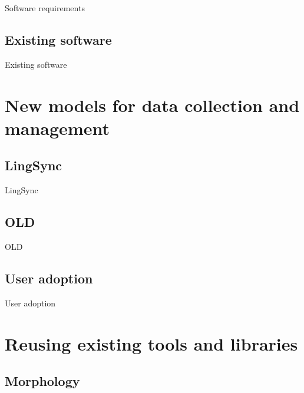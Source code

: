\documentclass{beamer}
\begin{document}
\begin{frame}
Software requirements
\end{frame}


\subsection{Existing software}

\begin{frame}
Existing software
\end{frame}


\section[LingSync/OLD]{New models for data collection and management}
\subsection{LingSync}\label{sec:lingsync}

\begin{frame}
LingSync
\end{frame}

\subsection{OLD}\label{sec:old}

\begin{frame}
OLD
\end{frame}


\subsection{User adoption}

\begin{frame}
User adoption
\end{frame}

\section[FieldLinguists]{Reusing existing tools and libraries}
\subsection{Morphology}
\end{document}
